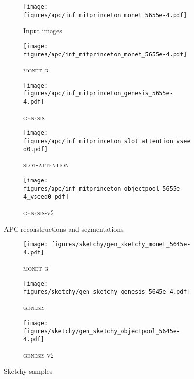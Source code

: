 \documentclass{article}
\begin{document}
\begin{figure}[h!]
	\centering
	\begin{subfigure}{\linewidth}
	    \texttt{[image: figures/apc/inf\_mitprinceton\_monet\_5655e-4.pdf]}
	    \caption{Input images}
	    \vspace{6pt}
	\end{subfigure}
	\begin{subfigure}{\linewidth}
	    \texttt{[image: figures/apc/inf\_mitprinceton\_monet\_5655e-4.pdf]}
	    \caption{\textsc{monet-g}}
	    \vspace{6pt}
	\end{subfigure}
	\begin{subfigure}{\linewidth}
	    \texttt{[image: figures/apc/inf\_mitprinceton\_genesis\_5655e-4.pdf]}
	    \caption{\textsc{genesis}}
	    \vspace{6pt}
	\end{subfigure}
	\begin{subfigure}{\linewidth}
	    \texttt{[image: figures/apc/inf\_mitprinceton\_slot\_attention\_vseed0.pdf]}
	    \caption{\textsc{slot-attention}}
	    \vspace{6pt}
	\end{subfigure}
	\begin{subfigure}{\linewidth}
	    \texttt{[image: figures/apc/inf\_mitprinceton\_objectpool\_5655e-4\_vseed0.pdf]}
	    \caption{\textsc{genesis-v2}}
	\end{subfigure}
	\caption{APC reconstructions and segmentations.}
\end{figure}

\begin{figure}[h!]
	\centering
	\begin{subfigure}{\linewidth}
	    \texttt{[image: figures/sketchy/gen\_sketchy\_monet\_5645e-4.pdf]}
	    \caption{\textsc{monet-g}}
	    \vspace{6pt}
	\end{subfigure}
	\begin{subfigure}{\linewidth}
	    \texttt{[image: figures/sketchy/gen\_sketchy\_genesis\_5645e-4.pdf]}
	    \caption{\textsc{genesis}}
	    \vspace{6pt}
	\end{subfigure}
    \begin{subfigure}{\linewidth}
	    \texttt{[image: figures/sketchy/gen\_sketchy\_objectpool\_5645e-4.pdf]}
	    \caption{\textsc{genesis-v2}}
	\end{subfigure}
	\caption{Sketchy samples.}
	\label{fig:gpp:sketchy:gen}
\end{figure}
\end{document}

